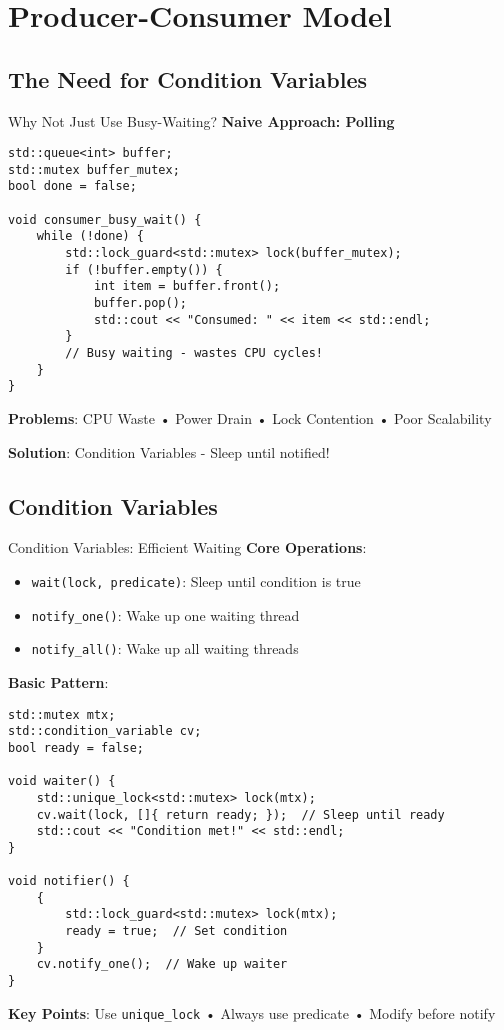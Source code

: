 \section{Producer-Consumer Model}

\subsection{The Need for Condition Variables}
\begin{frame}[fragile]{ Why Not Just Use Busy-Waiting?}
	\textbf{Naive Approach: Polling}
	\begin{verbatim}
std::queue<int> buffer;
std::mutex buffer_mutex;
bool done = false;

void consumer_busy_wait() {
    while (!done) {
        std::lock_guard<std::mutex> lock(buffer_mutex);
        if (!buffer.empty()) {
            int item = buffer.front();
            buffer.pop();
            std::cout << "Consumed: " << item << std::endl;
        }
        // Busy waiting - wastes CPU cycles!
    }
}
	\end{verbatim}

	\textbf{Problems}: CPU Waste • Power Drain • Lock Contention • Poor Scalability

	 \textbf{Solution}: Condition Variables - Sleep until notified!
\end{frame}

\subsection{Condition Variables}
\begin{frame}[fragile]{ Condition Variables: Efficient Waiting}
	\textbf{Core Operations}:
	\begin{itemize}
		\item \texttt{wait(lock, predicate)}: Sleep until condition is true
		\item \texttt{notify\_one()}: Wake up one waiting thread
		\item \texttt{notify\_all()}: Wake up all waiting threads
	\end{itemize}

	\vspace{0.5em}
	\textbf{Basic Pattern}:
	\begin{verbatim}
std::mutex mtx;
std::condition_variable cv;
bool ready = false;

void waiter() {
    std::unique_lock<std::mutex> lock(mtx);
    cv.wait(lock, []{ return ready; });  // Sleep until ready
    std::cout << "Condition met!" << std::endl;
}

void notifier() {
    {
        std::lock_guard<std::mutex> lock(mtx);
        ready = true;  // Set condition
    }
    cv.notify_one();  // Wake up waiter
}
	\end{verbatim}

	\textbf{Key Points}: Use \texttt{unique\_lock} • Always use predicate • Modify before notify
\end{frame}

